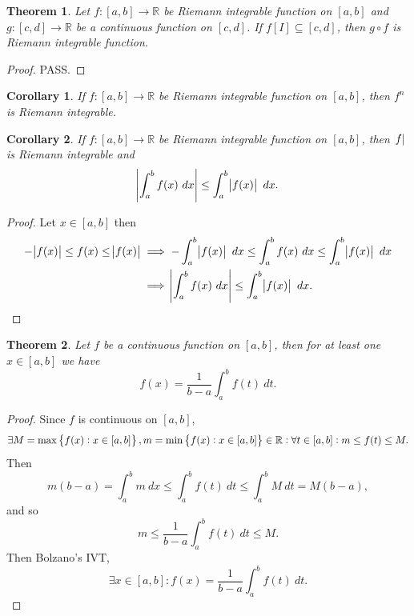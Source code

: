 \documentclass[12pt,openany]{book}
\newtheorem{theorem}{Theorem}[chapter]
\newtheorem{corollary}{Corollary}[theorem]
\theoremstyle{definition}
\newcommand{\R}{\mathbb{R}}
\begin{document}
	\newpage
	\begin{tcolorbox}[colframe=thmcolor, title={\color{white}\bf }]
		\begin{theorem}
			Let $f:[a,b]\to\R$ be Riemann integrable function on $[a,b]$ and $g:[c,d]\to\R$ be a continuous function on $[c,d]$. If $f[I]\subseteq[c,d]$, then $g\circ f$ is Riemann integrable function.
		\end{theorem}
	\end{tcolorbox}
	\begin{proof}
		PASS.
	\end{proof}
	\vspace{10pt}
	\begin{tcolorbox}[colframe=corcolor, title={\color{white}\bf }]
		\begin{corollary}
			If $f:[a,b]\to\R$ be Riemann integrable function on $[a,b]$, then $f^n$ is Riemann integrable.
		\end{corollary}
	\end{tcolorbox}
	\vspace{10pt}
	\begin{tcolorbox}[colframe=corcolor, title={\color{white}\bf }]
		\begin{corollary}
			If $f:[a,b]\to\R$ be Riemann integrable function on $[a,b]$, then $\abs{f}$ is Riemann integrable and \[
			\abs{\int_a^bf(x)\ dx}\leq\int_a^b\abs{f(x)}\ dx.
			\]
		\end{corollary}
	\end{tcolorbox}
	\begin{proof}
		Let $x\in[a,b]$ then \begin{align*}
			-\abs{f(x)}\leq f(x)\leq\abs{f(x)}&\implies-\int_a^b\abs{f(x)}\ dx\leq\int_a^bf(x)\ dx\leq\int_a^b\abs{f(x)}\ dx\\
			&\implies\abs{\int_a^bf(x)\ dx}\leq\int_a^b\abs{f(x)}\ dx.
		\end{align*}
	\end{proof}
	\vspace{20pt}
	\begin{tcolorbox}[colframe=thmcolor, title={\color{white}\bf Intermediate Value Theorem for Integrals}]
		\begin{theorem}
			Let $f$ be a continuous function on $[a,b]$, then for at least one $x\in[a,b]$ we have \[
			f(x)=\frac{1}{b-a}\int_a^bf(t)\ dt.
			\]
		\end{theorem}
	\end{tcolorbox}
	\begin{proof}
		Since \(f\) is continuous on \([a,b]\), \[
		\exists M=\max\set{f(x):x\in[a,b]},m=\min\set{f(x):x\in[a,b]}\in\R:\forall t\in[a,b]:m\leq f(t)\leq M.
		\] Then \[
		m(b-a)=\int_a^bm\ dx\leq \int_a^b f(t)\ dt\leq\int_a^bM\ dt = M(b-a),
		\] and so \[
		m\leq\frac{1}{b-a}\int_a^b f(t)\ dt\leq M.
		\] Then Bolzano's IVT, \[
		\exists x\in[a,b]: f(x)=\frac{1}{b-a}\int_a^bf(t)\ dt.
		\]
	\end{proof}
	
\end{document}

